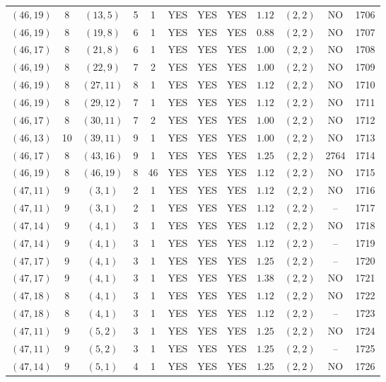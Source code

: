 \begin{longtable}{|c|c|c|c|c|c|c|c|c|c|c|c|}
$(46,19)$ & 8 & $(13,5)$ & 5 & 1 & YES & YES & YES & $1.12$ & $(2,2)$ & NO & 1706\\
$(46,19)$ & 8 & $(19,8)$ & 6 & 1 & YES & YES & YES & $0.88$ & $(2,2)$ & NO & 1707\\
$(46,17)$ & 8 & $(21,8)$ & 6 & 1 & YES & YES & YES & $1.00$ & $(2,2)$ & NO & 1708\\
$(46,19)$ & 8 & $(22,9)$ & 7 & 2 & YES & YES & YES & $1.00$ & $(2,2)$ & NO & 1709\\
$(46,19)$ & 8 & $(27,11)$ & 8 & 1 & YES & YES & YES & $1.12$ & $(2,2)$ & NO & 1710\\
$(46,19)$ & 8 & $(29,12)$ & 7 & 1 & YES & YES & YES & $1.12$ & $(2,2)$ & NO & 1711\\
$(46,17)$ & 8 & $(30,11)$ & 7 & 2 & YES & YES & YES & $1.00$ & $(2,2)$ & NO & 1712\\
$(46,13)$ & 10 & $(39,11)$ & 9 & 1 & YES & YES & YES & $1.00$ & $(2,2)$ & NO & 1713\\
$(46,17)$ & 8 & $(43,16)$ & 9 & 1 & YES & YES & YES & $1.25$ & $(2,2)$ & 2764 & 1714\\
$(46,19)$ & 8 & $(46,19)$ & 8 & 46 & YES & YES & YES & $1.12$ & $(2,2)$ & NO & 1715\\
$(47,11)$ & 9 & $(3,1)$ & 2 & 1 & YES & YES & YES & $1.12$ & $(2,2)$ & NO & 1716\\
$(47,11)$ & 9 & $(3,1)$ & 2 & 1 & YES & YES & YES & $1.12$ & $(2,2)$ & -- & 1717\\
$(47,14)$ & 9 & $(4,1)$ & 3 & 1 & YES & YES & YES & $1.12$ & $(2,2)$ & NO & 1718\\
$(47,14)$ & 9 & $(4,1)$ & 3 & 1 & YES & YES & YES & $1.12$ & $(2,2)$ & -- & 1719\\
$(47,17)$ & 9 & $(4,1)$ & 3 & 1 & YES & YES & YES & $1.25$ & $(2,2)$ & -- & 1720\\
$(47,17)$ & 9 & $(4,1)$ & 3 & 1 & YES & YES & YES & $1.38$ & $(2,2)$ & NO & 1721\\
$(47,18)$ & 8 & $(4,1)$ & 3 & 1 & YES & YES & YES & $1.12$ & $(2,2)$ & NO & 1722\\
$(47,18)$ & 8 & $(4,1)$ & 3 & 1 & YES & YES & YES & $1.12$ & $(2,2)$ & -- & 1723\\
$(47,11)$ & 9 & $(5,2)$ & 3 & 1 & YES & YES & YES & $1.25$ & $(2,2)$ & NO & 1724\\
$(47,11)$ & 9 & $(5,2)$ & 3 & 1 & YES & YES & YES & $1.25$ & $(2,2)$ & -- & 1725\\
$(47,14)$ & 9 & $(5,1)$ & 4 & 1 & YES & YES & YES & $1.25$ & $(2,2)$ & NO & 1726\\

\end{longtable}
